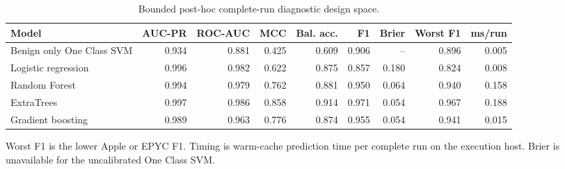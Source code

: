 \begin{table}[!t]
\centering
\caption{Bounded post-hoc complete-run diagnostic design space.}
\label{tab:prism_diagnostic_ranker}
{\scriptsize\setlength{\tabcolsep}{3.2pt}\renewcommand{\arraystretch}{1.05}
\begin{tabular}{lrrrrrrrr}
\toprule
Model & AUC-PR & ROC-AUC & MCC & Bal. acc. & F1 & Brier & Worst F1 & ms/run \\
\midrule
Benign only One Class SVM & 0.934 & 0.881 & 0.425 & 0.609 & 0.906 & -- & 0.896 & 0.005 \\
Logistic regression & 0.996 & 0.982 & 0.622 & 0.875 & 0.857 & 0.180 & 0.824 & 0.008 \\
Random Forest & 0.994 & 0.979 & 0.762 & 0.881 & 0.950 & 0.064 & 0.940 & 0.158 \\
ExtraTrees & 0.997 & 0.986 & 0.858 & 0.914 & 0.971 & 0.054 & 0.967 & 0.188 \\
Gradient boosting & 0.989 & 0.963 & 0.776 & 0.874 & 0.955 & 0.054 & 0.941 & 0.015 \\
\bottomrule
\end{tabular}
}
\vspace{2pt}\scriptsize\raggedright Worst F1 is the lower Apple or EPYC F1. Timing is warm-cache prediction time per complete run on the execution host. Brier is unavailable for the uncalibrated One Class SVM.
\end{table}

